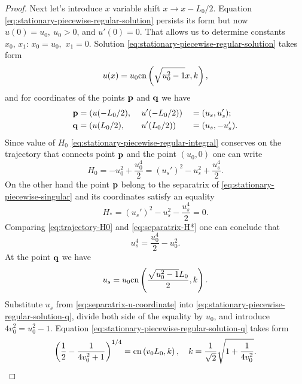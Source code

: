 \begin{proof}
	Next let's introduce $x$ variable shift $x \to x - L_0 / 2$.
	Equation \eqref{eq:stationary-piecewise-regular-solution} persists its form but now $u(0) = u_0, \ u_0 > 0$, and $u'(0) = 0$.
	That allows us to determine constants $x_0, \, x_1$: $x_0 = u_0,$ $x_1 = 0$.
	Solution \eqref{eq:stationary-piecewise-regular-solution} takes form
	\begin{equation}
		u(x) = u_0 \mathrm{cn} \left( \sqrt{u_0^2 - 1} x, k \right),
	\label{eq:stationary-piecewise-regular-solution-shifted}
	\end{equation}
	and for coordinates of the points $\vb{p}$ and $\vb{q}$ we have
	\begin{alignat}{3}
		& \vb{p} = (u(-L_0 / 2), && \ u'(-L_0 / 2)) && = (u_s, u_s'); \label{eq:p-first-group} \\
		& \vb{q} = (u(L_0 / 2),  && \ u'(L_0 / 2)) && = (u_s, -u_s'). \label{eq:q-first-group}
    \end{alignat}
	Since value of $H_0$ \eqref{eq:stationary-piecewise-regular-integral} conserves on the trajectory that connects point $\vb{p}$ and the point $(u_0, 0)$ one can write
	\begin{equation}
		H_0 = -u_0^2 + \frac{u_0^4}{2} = (u_s')^2 - u_s^2 + \frac{u_s^4}{2}.
	\label{eq:trajectory-H0}
	\end{equation}
	On the other hand the point $\vb{p}$ belong to the separatrix of \eqref{eq:stationary-piecewise-singular} and its coordinates satisfy an equality
	\begin{equation}
		H_* = (u_s')^2 - u_s^2 - \frac{u_s^4}{2} = 0.
	\label{eq:separatrix-H*}
	\end{equation}
	Comparing \eqref{eq:trajectory-H0} and \eqref{eq:separatrix-H*} one can conclude that
	\begin{equation}
		u_s^4 = \frac{u_0^4}{2} - u_0^2.
	\label{eq:separatrix-u-coordinate}
	\end{equation}
	At the point $\vb{q}$ we have
	\begin{equation}
		u_s = u_0 \mathrm{cn} \left(\frac{\sqrt{u_0^2 - 1} L_0}{2}, k \right).
	\label{eq:stationary-piecewise-regular-solution-q}
	\end{equation}
	Substitute $u_s$ from \eqref{eq:separatrix-u-coordinate} into \eqref{eq:stationary-piecewise-regular-solution-q}, divide both side of the equality by $u_0$, and introduce $4 v_0^2 = u_0^2 - 1$.
	Equation \eqref{eq:stationary-piecewise-regular-solution-q} takes form
	\begin{equation}
		\left( \frac{1}{2} - \frac{1}{4 v_0^2 + 1} \right)^{1/4} = \mathrm{cn} \left( v_0 L_0, k \right), \quad k = \frac{1}{\sqrt{2}} \sqrt{1 + \frac{1}{4 v_0^2}}.
	\label{eq:v0-elliptic-relation}
	\end{equation}
	

\end{proof}
